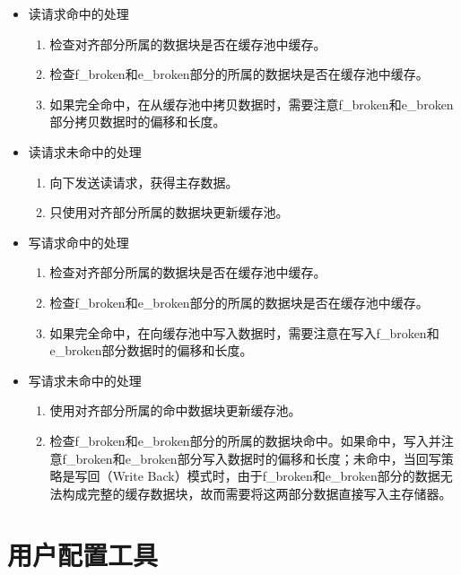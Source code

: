\begin{itemize}

\item 读请求命中的处理
\begin{enumerate}
\item 检查对齐部分所属的数据块是否在缓存池中缓存。
\item 检查f\_broken和e\_broken部分的所属的数据块是否在缓存池中缓存。
\item 如果完全命中，在从缓存池中拷贝数据时，需要注意f\_broken和e\_broken部分拷贝数据时的偏移和长度。
\end{enumerate}

\item 读请求未命中的处理
\begin{enumerate}
\item 向下发送读请求，获得主存数据。
\item 只使用对齐部分所属的数据块更新缓存池。
\end{enumerate}

\item 写请求命中的处理
\begin{enumerate}
\item 检查对齐部分所属的数据块是否在缓存池中缓存。
\item 检查f\_broken和e\_broken部分的所属的数据块是否在缓存池中缓存。
\item 如果完全命中，在向缓存池中写入数据时，需要注意在写入f\_broken和e\_broken部分数据时的偏移和长度。
\end{enumerate}

\item 写请求未命中的处理
\begin{enumerate}
\item 使用对齐部分所属的命中数据块更新缓存池。
\item 检查f\_broken和e\_broken部分的所属的数据块命中。如果命中，写入并注意f\_broken和e\_broken部分写入数据时的偏移和长度；未命中，当回写策略是写回（Write Back）模式时，由于f\_broken和e\_broken部分的数据无法构成完整的缓存数据块，故而需要将这两部分数据直接写入主存储器。
\end{enumerate}

\end{itemize}


\section{用户配置工具}
\label{sec:config_utility}

